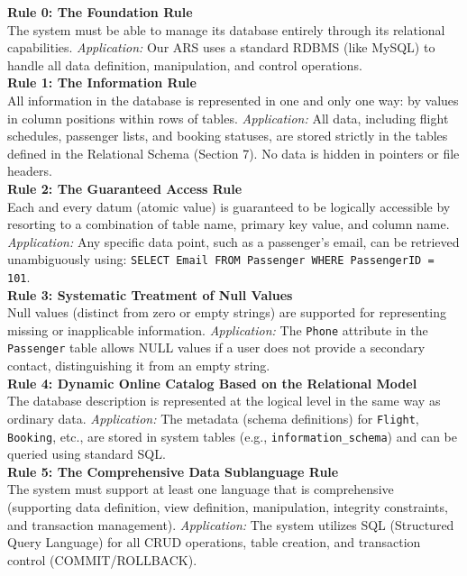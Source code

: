 \documentclass[12pt, a4paper]{article}
\begin{document}
	\textbf{Rule 0: The Foundation Rule} \\
	The system must be able to manage its database entirely through its relational capabilities. 
	\textit{Application:} Our ARS uses a standard RDBMS (like MySQL) to handle all data definition, manipulation, and control operations.\\
	
	\textbf{Rule 1: The Information Rule} \\
	All information in the database is represented in one and only one way: by values in column positions within rows of tables.
	\textit{Application:} All data, including flight schedules, passenger lists, and booking statuses, are stored strictly in the tables defined in the Relational Schema (Section 7). No data is hidden in pointers or file headers.\\
	
	\textbf{Rule 2: The Guaranteed Access Rule} \\
	Each and every datum (atomic value) is guaranteed to be logically accessible by resorting to a combination of table name, primary key value, and column name.
	\textit{Application:} Any specific data point, such as a passenger's email, can be retrieved unambiguously using: \texttt{SELECT Email FROM Passenger WHERE PassengerID = 101}.\\
	
	\textbf{Rule 3: Systematic Treatment of Null Values} \\
	Null values (distinct from zero or empty strings) are supported for representing missing or inapplicable information.
	\textit{Application:} The \texttt{Phone} attribute in the \texttt{Passenger} table allows NULL values if a user does not provide a secondary contact, distinguishing it from an empty string.\\
	
	\textbf{Rule 4: Dynamic Online Catalog Based on the Relational Model} \\
	The database description is represented at the logical level in the same way as ordinary data.
	\textit{Application:} The metadata (schema definitions) for \texttt{Flight}, \texttt{Booking}, etc., are stored in system tables (e.g., \texttt{information\_schema}) and can be queried using standard SQL.\\
	
	\textbf{Rule 5: The Comprehensive Data Sublanguage Rule} \\
	The system must support at least one language that is comprehensive (supporting data definition, view definition, manipulation, integrity constraints, and transaction management).
	\textit{Application:} The system utilizes SQL (Structured Query Language) for all CRUD operations, table creation, and transaction control (COMMIT/ROLLBACK).\\
	
\end{document}
